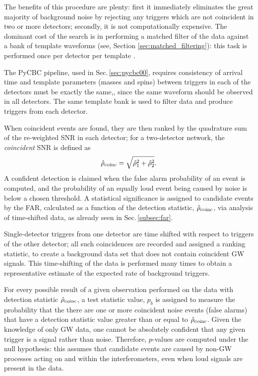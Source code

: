 \documentclass[binding=0.6cm, LaM]{sapthesis}
\begin{document}
        The benefits of this procedure are plenty: first it immediately eliminates the great majority of background noise 
	by rejecting any triggers which are not coincident in two or more detectors;
	secondly, it is not computationally expensive.
        The dominant cost of the search is in performing a matched filter 
        of the data against a bank of template waveforms (see, Section \ref{sec:matched_filtering}):
        this task is performed once per detector per template \cite{28, 45}.

	The {\ttfamily PyCBC} pipeline, used in Sec.\,\ref{sec:pycbc00}, 
	requires consistency of arrival time and template parameters (masses and spins) 
	between triggers in each of the detectors must be exactly the same,,
	since the same waveform should be observed in all detectors.
	The same template bank is used to filter data and produce triggers from each detector.

	When coincident events are found, they are then ranked by the quadrature sum of the re-weighted SNR in each detector;
	for a two-detector network, the \textit{coincident} SNR is defined as
        \begin{equation}
          \label{eq:rhocoincPyCBC}
          \hat{\rho}_{\rm coinc}  = \sqrt{\hat{\rho}^2_1 + \hat{\rho}^2_2}.
        \end{equation}
	A confident detection is claimed when the false alarm probability of an event is computed,
	and the probability of an equally loud event being caused by noise is below a chosen threshold. 
	A statistical significance is assigned to candidate events by the FAR,
	calculated as a function of the detection statistic, $\hat{\rho}_{\rm coinc}$,
	via analysis of time-shifted data, as already seen in Sec.\,\ref{subsec:far}.

	Single-detector triggers from one detector are time shifted with respect to triggers of the other detector;
	all such coincidences are recorded and assigned a ranking statistic, 
	to create a background data set that does not contain coincident GW signals.
	This time-shifting of the data is performed many times to obtain a representative estimate of the expected rate of background triggers.

	For every possible result of a given observation performed on the data with detection statistic $\hat{\rho}_{\rm coinc}$, 
	a test statistic value, $p_b$ is assigned to measure the probability that the 
	there are one or more coincident noise events (false alarms) that have
	a detection statistic value greater than or equal to $\hat{\rho}_{\rm coinc}$. 
	Given the knowledge of only GW data, one cannot be absolutely confident that 
	any given trigger is a signal rather than noise. 
	Therefore, $p$-values are computed under the null hypothesis: this assumes that candidate events 
	are caused by non-GW processes acting on and within the interferometers,
	even when loud signals are present in the data.
\end{document}
